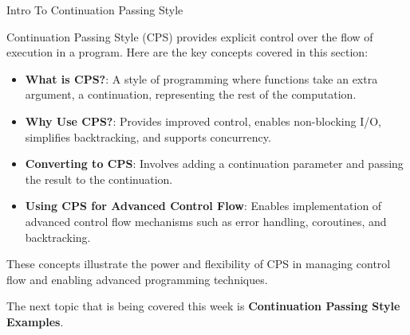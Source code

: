 \begin{notes}{Intro To Continuation Passing Style}
\begin{highlight}
        Continuation Passing Style (CPS) provides explicit control over the flow of execution in a program. Here are the key concepts covered in this section:
    
        \begin{itemize}
            \item \textbf{What is CPS?}: A style of programming where functions take an extra argument, a continuation, representing the rest of the computation.
            \item \textbf{Why Use CPS?}: Provides improved control, enables non-blocking I/O, simplifies backtracking, and supports concurrency.
            \item \textbf{Converting to CPS}: Involves adding a continuation parameter and passing the result to the continuation.
            \item \textbf{Using CPS for Advanced Control Flow}: Enables implementation of advanced control flow mechanisms such as error handling, coroutines, and backtracking.
        \end{itemize}
    
        These concepts illustrate the power and flexibility of CPS in managing control flow and enabling advanced programming techniques.
    
    \end{highlight}
\end{notes}

The next topic that is being covered this week is \textbf{Continuation Passing Style Examples}.

